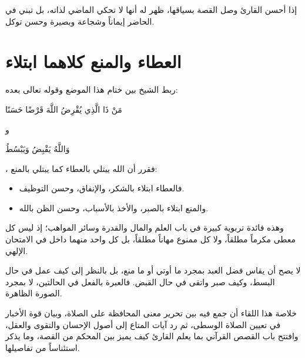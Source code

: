 \begin{fawaid}
إذا أحسن القارئ وصل القصة بسياقها، ظهر له أنها لا تحكي الماضي لذاته، بل تبني في الحاضر إيماناً وشجاعة وبصيرة وحسن توكل.
\end{fawaid}

\section{العطاء والمنع كلاهما ابتلاء}
ربط الشيخ بين ختام هذا الموضع وقوله تعالى بعده: \begin{ayah}مَنْ ذَا الَّذِي يُقْرِضُ اللَّهَ قَرْضًا حَسَنًا\end{ayah} و\begin{ayah}وَاللَّهُ يَقْبِضُ وَيَبْسُطُ\end{ayah}، فقرر أن الله يبتلي بالعطاء كما يبتلي بالمنع:
\begin{itemize}
    \item فالعطاء ابتلاء بالشكر، والإنفاق، وحسن التوظيف.
    \item والمنع ابتلاء بالصبر، والأخذ بالأسباب، وحسن الظن بالله.
\end{itemize}

وهذه فائدة تربوية كبيرة في باب العلم والمال والقدرة وسائر المواهب؛ إذ ليس كل معطى مكرماً مطلقاً، ولا كل ممنوع مهاناً مطلقاً، بل كل واحد منهما داخل في الامتحان الإلهي.

\begin{fawaid}
لا يصح أن يقاس فضل العبد بمجرد ما أوتي أو ما منع، بل بالنظر إلى كيف عمل في حال البسط، وكيف صبر واتقى في حال القبض. فالعبرة بالفعل في الحالتين، لا بمجرد الصورة الظاهرة.
\end{fawaid}

\separator

خلاصة هذا اللقاء أن  جمع فيه بين تحرير معنى المحافظة على الصلاة، وبيان قوة الأخبار في تعيين الصلاة الوسطى، ثم رد آيات المتاع إلى أصول الإحسان والتقوى والعقل، وافتتح باب القصص القرآني بما يعلم القارئ كيف يميز بين المحكم من القصة، وما يذكر استئناساً من تفاصيلها.
